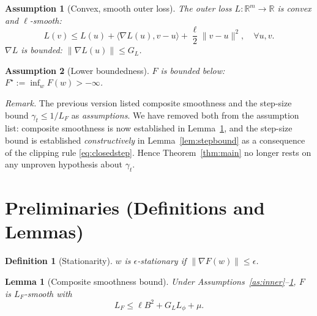 \documentclass[11pt]{article}
\newtheorem{lemma}{Lemma}
\newtheorem{assumption}{Assumption}
\newtheorem{definition}{Definition}
\begin{document}
\begin{assumption}[Convex, smooth outer loss]\label{as:outer}
The outer loss $L:\mathbb{R}^m\to\mathbb{R}$ is convex and $\ell$-smooth:
\[
L(v) \le L(u) + \langle \nabla L(u), v-u\rangle + \frac{\ell}{2}\|v-u\|^2,
\quad \forall u,v .
\]
$\nabla L$ is bounded: $\|\nabla L(u)\| \le G_L$.
\end{assumption}

\begin{assumption}[Lower boundedness]\label{as:lb}
$F$ is bounded below: $F^\star := \inf_w F(w) > -\infty$.
\end{assumption}


\medskip
\noindent\emph{Remark.} The previous version listed composite smoothness and the
step-size bound $\gamma_t\le 1/L_F$ as \emph{assumptions}. We have removed both
from the assumption list: composite smoothness is now established in
Lemma~\ref{lem:smooth}, and the step-size bound is established
\emph{constructively} in Lemma~\ref{lem:stepbound} as a consequence of the
clipping rule \eqref{eq:closedstep}. Hence Theorem~\ref{thm:main} no longer
rests on any unproven hypothesis about $\gamma_t$.

\section*{Preliminaries (Definitions and Lemmas)}

\begin{definition}[Stationarity]
$w$ is $\epsilon$-stationary if $\|\nabla F(w)\| \le \epsilon$.
\end{definition}

\begin{lemma}[Composite smoothness bound]\label{lem:smooth}
Under Assumptions~\ref{as:inner}--\ref{as:outer}, $F$ is $L_F$-smooth with
\[
L_F \le \ell B^2 + G_L L_\phi + \mu .
\]
\end{lemma}
\end{document}
